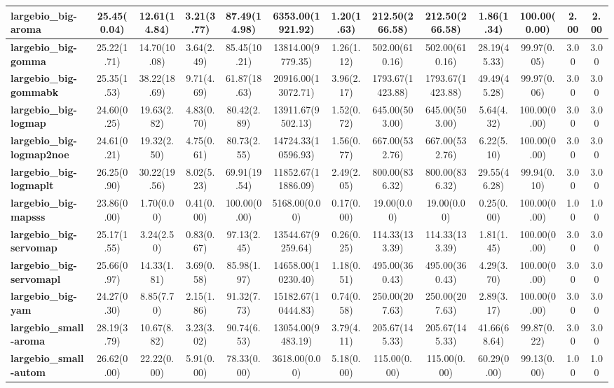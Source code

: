 \begin{tabular}{|l|c|c|c|c|c|c|c|c|c|c|c|c|}
\textbf{largebio\_big-aroma}&25.45(0.04)&12.61(14.84)&3.21(3.77)&87.49(14.98)&6353.00(1921.92)&1.20(1.63)&212.50(266.58)&212.50(266.58)&1.86(1.34)&100.00(0.00)&2.00&2.00\\\hline
\textbf{largebio\_big-gomma}&25.22(1.71)&14.70(10.08)&3.64(2.49)&85.45(10.21)&13814.00(9779.35)&1.26(1.12)&502.00(610.16)&502.00(610.16)&28.19(45.33)&99.97(0.05)&3.00&3.00\\\hline
\textbf{largebio\_big-gommabk}&25.35(1.53)&38.22(18.69)&9.71(4.69)&61.87(18.63)&20916.00(13072.71)&3.96(2.17)&1793.67(1423.88)&1793.67(1423.88)&49.49(45.28)&99.97(0.06)&3.00&3.00\\\hline
\textbf{largebio\_big-logmap}&24.60(0.25)&19.63(2.82)&4.83(0.70)&80.42(2.89)&13911.67(9502.13)&1.52(0.72)&645.00(503.00)&645.00(503.00)&5.64(4.32)&100.00(0.00)&3.00&3.00\\\hline
\textbf{largebio\_big-logmap2noe}&24.61(0.21)&19.32(2.50)&4.75(0.61)&80.73(2.55)&14724.33(10596.93)&1.56(0.77)&667.00(532.76)&667.00(532.76)&6.22(5.10)&100.00(0.00)&3.00&3.00\\\hline
\textbf{largebio\_big-logmaplt}&26.25(0.90)&30.22(19.56)&8.02(5.23)&69.91(19.54)&11852.67(11886.09)&2.49(2.05)&800.00(836.32)&800.00(836.32)&29.55(46.28)&99.94(0.10)&3.00&3.00\\\hline
\textbf{largebio\_big-mapsss}&23.86(0.00)&1.70(0.00)&0.41(0.00)&100.00(0.00)&5168.00(0.00)&0.17(0.00)&19.00(0.00)&19.00(0.00)&0.25(0.00)&100.00(0.00)&1.00&1.00\\\hline
\textbf{largebio\_big-servomap}&25.17(1.55)&3.24(2.50)&0.83(0.67)&97.13(2.45)&13544.67(9259.64)&0.26(0.25)&114.33(133.39)&114.33(133.39)&1.81(1.45)&100.00(0.00)&3.00&3.00\\\hline
\textbf{largebio\_big-servomapl}&25.66(0.97)&14.33(1.81)&3.69(0.58)&85.98(1.97)&14658.00(10230.40)&1.18(0.51)&495.00(360.43)&495.00(360.43)&4.29(3.70)&100.00(0.00)&3.00&3.00\\\hline
\textbf{largebio\_big-yam}&24.27(0.30)&8.85(7.70)&2.15(1.86)&91.32(7.73)&15182.67(10444.83)&0.74(0.58)&250.00(207.63)&250.00(207.63)&2.89(3.17)&100.00(0.00)&3.00&3.00\\\hline
\textbf{largebio\_small-aroma}&28.19(3.79)&10.67(8.82)&3.23(3.02)&90.74(6.53)&13054.00(9483.19)&3.79(4.11)&205.67(145.33)&205.67(145.33)&41.66(68.64)&99.87(0.22)&3.00&3.00\\\hline
\textbf{largebio\_small-autom}&26.62(0.00)&22.22(0.00)&5.91(0.00)&78.33(0.00)&3618.00(0.00)&5.18(0.00)&115.00(0.00)&115.00(0.00)&60.29(0.00)&99.13(0.00)&1.00&1.00\\\hline

\end{tabular}
